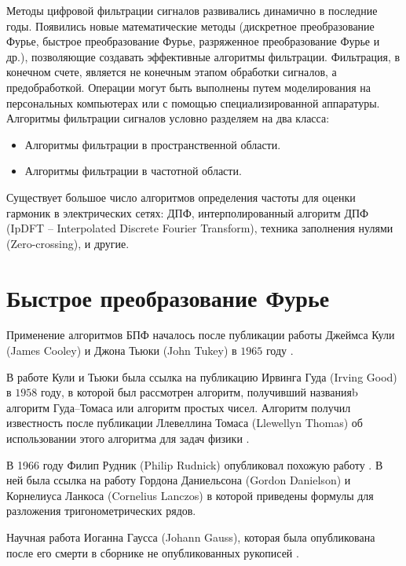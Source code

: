 \cite{Digital_processing_Sergienko_2011}

Методы цифровой фильтрации сигналов развивались динамично в последние годы. Появились новые математические методы (дискретное преобразование Фурье, быстрое преобразование Фурье, разряженное преобразование Фурье и др.), позволяющие создавать эффективные алгоритмы фильтрации. Фильтрация, в конечном счете, является не конечным этапом обработки сигналов, а предобработкой. Операции могут быть выполнены путем моделирования на персональных компьютерах или с помощью специализированной аппаратуры.
Алгоритмы фильтрации сигналов условно разделяем на два класса:
\begin{itemize}
	\item Алгоритмы фильтрации в пространственной области.
	\item Алгоритмы фильтрации в частотной области.
\end{itemize}



Существует большое число алгоритмов определения частоты для оценки гармоник в электрических сетях: ДПФ, интерполированный алгоритм ДПФ (IpDFT -- Interpolated Discrete Fourier Transform), техника заполнения нулями (Zero-crossing), и другие.
\section{Быстрое преобразование Фурье} \label{sec:ch2/sec1}

Применение алгоритмов БПФ началось после публикации работы Джеймса Кули (James Cooley) и Джона Тьюки (John Tukey) в $1965$ году \cite{cooley1965algorithm}. 

В работе Кули и Тьюки была ссылка на публикацию Ирвинга Гуда (Irving Good) \cite{good1958interaction} в $1958$ году, в которой был рассмотрен алгоритм, получивший названияb алгоритм Гуда–Томаса или алгоритм простых чисел. Алгоритм получил известность после публикации Ллевеллина Томаса (Llewellyn Thomas) об использовании этого алгоритма для задач физики \cite{thomas1963using}.

В 1966 году Филип Рудник (Philip Rudnick) опубликовал похожую работу \cite{rudnick1966note}. В ней была ссылка на работу Гордона Даниельсона (Gordon Danielson) и Корнелиуса Ланкоса (Cornelius Lanczos) \cite{danielson1942some} в которой приведены формулы для разложения тригонометрических рядов. 

Научная работа Иоганна Гаусса (Johann Gauss), которая была опубликована после его смерти в сборнике не опубликованных рукописей \cite{gauss1866nachlass}.

